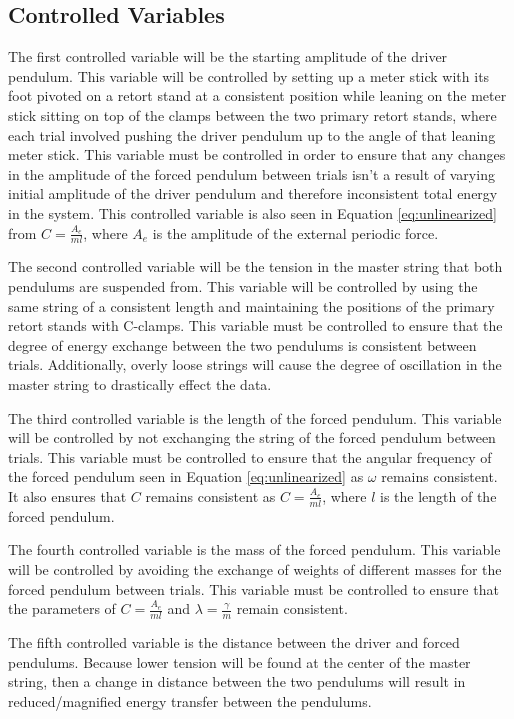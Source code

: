 \documentclass[letterpaper, 12pt]{article}
\begin{document}
\subsection{Controlled Variables}

The first controlled variable will be the starting amplitude of the
driver pendulum. This variable will be controlled by setting up a
meter stick with its foot pivoted on a retort stand at a
consistent position while leaning on the meter stick
sitting on top of the clamps between the two primary retort
stands, where each trial involved pushing the driver pendulum up to the
angle of that leaning meter stick. This variable must be controlled in
order to ensure that any changes in the amplitude of the forced
pendulum between trials isn't a result of varying
initial amplitude of the
driver pendulum and therefore inconsistent total energy in the system.
This controlled variable is also seen in Equation \ref*{eq:unlinearized}
from \(C = \frac{A_e}{ml}\), where \(A_e\) is the
amplitude of the external periodic force.

The second controlled variable will be the tension in the
master string that both pendulums are suspended from. This variable
will be controlled by using the same string of a consistent length
and maintaining the positions of the primary retort
stands with C-clamps. This variable must be controlled to
ensure that the degree of energy exchange between the
two pendulums is consistent between trials. Additionally,
overly loose strings will cause the degree of oscillation
in the master string to drastically effect the data.

The third controlled variable is the length of the
forced pendulum. This variable will be controlled by not
exchanging the string of the forced pendulum between trials.
This variable must be controlled to ensure that the
angular frequency of the forced pendulum seen
in Equation \ref*{eq:unlinearized} as \(\omega\)
remains consistent. It also ensures that \(C\)
remains consistent as \(C = \frac{A_e}{ml}\),
where \(l\) is the length of the forced pendulum.

The fourth controlled variable is the mass of
the forced pendulum. This variable will be controlled by
avoiding the exchange of weights of different
masses for the forced pendulum between trials.
This variable must be controlled to
ensure that the parameters of \(C = \frac{A_e}{ml}\)
and \(\lambda = \frac{\gamma}{m}\) remain consistent.

The fifth controlled variable is the distance
between the driver and forced pendulums. Because
lower tension will be found at the center of the
master string, then a change in distance between the
two pendulums will result in reduced/magnified
energy transfer between the pendulums.
\end{document}

